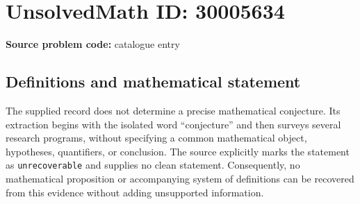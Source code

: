 \documentclass[11pt]{article}
\begin{document}
\section*{UnsolvedMath ID: 30005634}
\textbf{Source problem code:} catalogue entry
\subsection{Definitions and mathematical statement}
The supplied record does not determine a precise mathematical conjecture. Its extraction begins with the isolated word ``conjecture'' and then surveys several research programs, without specifying a common mathematical object, hypotheses, quantifiers, or conclusion. The source explicitly marks the statement as \texttt{unrecoverable} and supplies no clean statement. Consequently, no mathematical proposition or accompanying system of definitions can be recovered from this evidence without adding unsupported information.
\end{document}
